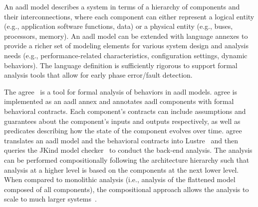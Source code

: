 An \gls{aadl} model describes a system in terms of a hierarchy of components and their interconnections, where each component can either represent a logical entity (e.g., application software functions, data) or a physical entity (e.g., buses, processors, memory). An \gls{aadl} model can be extended with language annexes to provide a richer set of modeling elements for various system design and analysis needs (e.g., performance-related characteristics, configuration settings, dynamic behaviors). The language definition is sufficiently rigorous to support formal analysis tools that allow for early phase error/fault detection.

The \gls{agree}~\cite{NFM2012:CoGaMiWhLaLu} is a tool for formal analysis of behaviors in \gls{aadl} models.  \gls{agree} is implemented as an \gls{aadl} annex and annotates \gls{aadl} components with formal behavioral contracts. Each component's contracts can include assumptions and guarantees about the component's inputs and outputs respectively, as well as predicates describing how the state of the component evolves over time. \gls{agree} translates an \gls{aadl} model and the behavioral contracts into Lustre~\cite{Halbwachs91:IEEE} and then queries the JKind
model checker~\cite{2017arXiv171201222G} to conduct the back-end analysis. The analysis %
can be performed compositionally following the architecture hierarchy such that analysis at a higher level is based on the components at the next lower level.  When compared to monolithic analysis (i.e., analysis of the flattened model composed of all components), the compositional approach allows the analysis to scale to much larger systems~\cite{NFM2012:CoGaMiWhLaLu}. 



